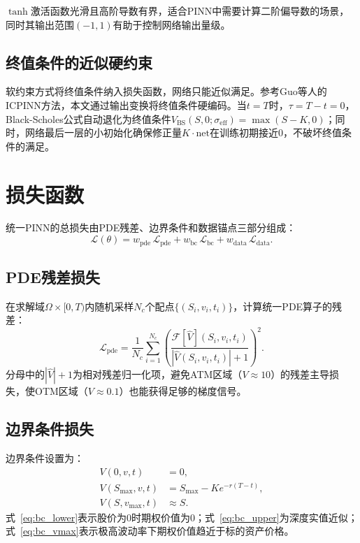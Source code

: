 $\tanh$激活函数光滑且高阶导数有界，适合PINN中需要计算二阶偏导数的场景，同时其输出范围$(-1,1)$有助于控制网络输出量级。

\subsection{终值条件的近似硬约束}

软约束方式将终值条件纳入损失函数，网络只能近似满足。参考Guo等人\cite{guo2024icpinn}的ICPINN方法，本文通过输出变换将终值条件硬编码。当$t=T$时，$\tau=T-t=0$，Black-Scholes公式自动退化为终值条件$V_\text{BS}(S,0;\sigma_\text{eff})=\max(S-K,0)$；同时，网络最后一层的小初始化确保修正量$K\cdot\text{net}$在训练初期接近0，不破坏终值条件的满足。

\section{损失函数}\label{sec:loss}

统一PINN的总损失由PDE残差、边界条件和数据锚点三部分组成：
\begin{equation}\label{eq:total_loss}
  \mathcal{L}(\theta) = w_\text{pde}\,\mathcal{L}_\text{pde}
                      + w_\text{bc}\,\mathcal{L}_\text{bc}
                      + w_\text{data}\,\mathcal{L}_\text{data}.
\end{equation}

\subsection{PDE残差损失}

在求解域$\Omega\times[0,T)$内随机采样$N_c$个配点$\{(S_i,v_i,t_i)\}$，计算统一PDE算子的残差：
\begin{equation}
  \mathcal{L}_\text{pde} = \frac{1}{N_c}\sum_{i=1}^{N_c}
    \left(\frac{\mathcal{F}[\hat{V}](S_i,v_i,t_i)}{|\hat{V}(S_i,v_i,t_i)|+1}\right)^2.
\end{equation}
分母中的$|\hat{V}|+1$为相对残差归一化项，避免ATM区域（$V\approx 10$）的残差主导损失，使OTM区域（$V\approx 0.1$）也能获得足够的梯度信号。

\subsection{边界条件损失}

边界条件设置为：
\begin{align}
  V(0,v,t) &= 0, \label{eq:bc_lower} \\
  V(S_\text{max},v,t) &= S_\text{max} - Ke^{-r(T-t)}, \label{eq:bc_upper} \\
  V(S,v_\text{max},t) &\approx S. \label{eq:bc_vmax}
\end{align}
式~\eqref{eq:bc_lower}表示股价为0时期权价值为0；式~\eqref{eq:bc_upper}为深度实值近似；式~\eqref{eq:bc_vmax}表示极高波动率下期权价值趋近于标的资产价格。

